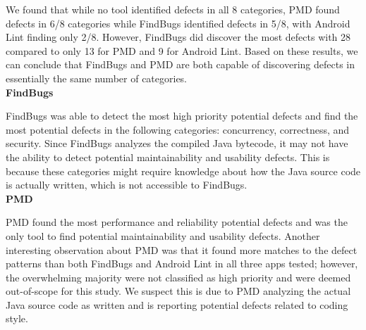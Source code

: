 \documentclass{sig-alternate}
\begin{document}
We found that while no tool identified defects in all 8 categories, PMD found defects in 6/8 categories while FindBugs identified defects in 5/8, with Android Lint finding only 2/8. However, FindBugs did discover the most defects with 28 compared to only 13 for PMD and 9 for Android Lint. Based on these results, we can conclude that FindBugs and PMD are both capable of discovering defects in essentially the same number of categories.\\



\noindent
\textbf{FindBugs}

FindBugs was able to detect the most high priority potential defects and find the most potential defects in the following categories: concurrency, correctness, and security. Since FindBugs analyzes the compiled Java bytecode, it may not have the ability to detect potential maintainability and usability defects. This is because these categories might require knowledge about how the Java source code is actually written, which is not accessible to FindBugs.\\ %

\noindent
\textbf{PMD}

PMD found the most performance and reliability potential defects and was the only tool to find potential maintainability and usability defects. Another interesting observation about PMD was that it found more matches to the defect patterns than both FindBugs and Android Lint in all three apps tested; however, the overwhelming majority were not classified as high priority and were deemed out-of-scope for this study. We suspect this is due to PMD analyzing the actual Java source code as written and is reporting potential defects related to coding style.\\
\end{document}
